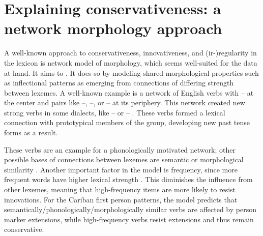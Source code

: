 \section{Explaining conservativeness: a network morphology approach}
\label{sec:motivations}
A well-known approach to conservativeness, innovativeness, and (ir-){}re\-gu\-la\-ri\-ty in the lexicon is  network model of morphology, which seems well-suited for the data at hand.
It aims to  \parencite[428]{bybee1995regular}.
It does so by modeling shared morphological properties such as inflectional patterns as emerging from connections of differing strength between lexemes.
A well-known example is a network of  English verbs with -- at the center and pairs like --, --, or -- at its periphery.
This network created new strong verbs in some dialects, like -- or -- \parencite[129--130]{bybee1985morphology}.
These verbs formed a lexical connection with prototypical members of the group, developing new past tense forms as a result.

These verbs are an example for a phonologically motivated network; other possible bases of connections between lexemes are semantic or morphological similarity \parencite[118]{bybee1985morphology}.
Another important factor in the model is frequency, since more frequent words have higher lexical strength \parencite[119]{bybee1985morphology}.
This diminishes the influence from other lexemes, meaning that high-frequency items are more likely to resist innovations.
For the Cariban first person patterns, the model predicts that semantically\slash{}phonologically\slash\hspace{0pt}morphologically similar verbs are affected by person marker extensions, while high-frequency verbs resist extensions and thus remain conservative.

